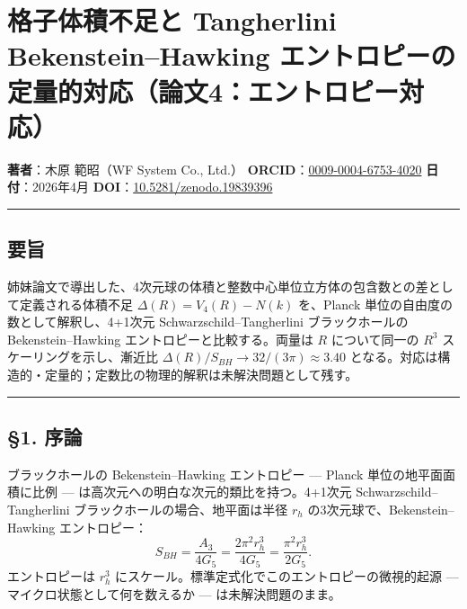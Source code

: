 \documentclass[a4paper,11pt]{ltjsarticle}
\theoremstyle{definition}
\begin{document}
\section{格子体積不足と Tangherlini Bekenstein--Hawking
エントロピーの定量的対応（論文4：エントロピー対応）}\label{ux683cux5b50ux4f53ux7a4dux4e0dux8db3ux3068-tangherlini-bekensteinhawking-ux30a8ux30f3ux30c8ux30edux30d4ux30fcux306eux5b9aux91cfux7684ux5bfeux5fdcux8ad6ux65874ux30a8ux30f3ux30c8ux30edux30d4ux30fcux5bfeux5fdc}

\textbf{著者}：木原 範昭（WF System Co., Ltd.）
\textbf{ORCID}：\href{https://orcid.org/0009-0004-6753-4020}{0009-0004-6753-4020}
\textbf{日付}：2026年4月
\textbf{DOI}：\href{https://doi.org/10.5281/zenodo.19839396}{10.5281/zenodo.19839396}

\begin{center}\rule{0.5\linewidth}{0.5pt}\end{center}

\subsection{要旨}\label{ux8981ux65e8}

姉妹論文で導出した、4次元球の体積と整数中心単位立方体の包含数との差として定義される体積不足
\(\Delta(R) = V_4(R) - N(k)\) を、Planck
単位の自由度の数として解釈し、4+1次元 Schwarzschild--Tangherlini
ブラックホールの Bekenstein--Hawking エントロピーと比較する。両量は
\(R\) について同一の \(R^3\) スケーリングを示し、漸近比
\(\Delta(R) / S_{BH} \to 32/(3\pi) \approx 3.40\)
となる。対応は構造的・定量的；定数比の物理的解釈は未解決問題として残す。

\begin{center}\rule{0.5\linewidth}{0.5pt}\end{center}

\subsection{§1. 序論}\label{ux5e8fux8ad6}

ブラックホールの Bekenstein--Hawking エントロピー --- Planck
単位の地平面面積に比例 --- は高次元への明白な次元的類比を持つ。4+1次元
Schwarzschild--Tangherlini ブラックホールの場合、地平面は半径 \(r_h\)
の3次元球で、Bekenstein--Hawking エントロピー：
\[S_{BH} = \frac{A_3}{4 G_5} = \frac{2\pi^2 r_h^3}{4 G_5} = \frac{\pi^2 r_h^3}{2 G_5}.\]
エントロピーは \(r_h^3\)
にスケール。標準定式化でこのエントロピーの微視的起源 ---
マイクロ状態として何を数えるか --- は未解決問題のまま。
\end{document}
